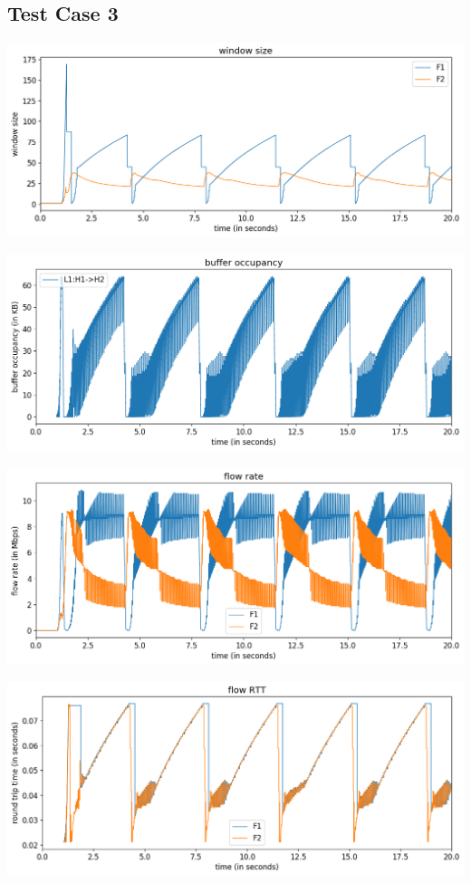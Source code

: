 \documentclass{article}
\begin{document}
\subsection{Test Case 3} 


\includegraphics[width = \textwidth]{"test_case3 window size"}

\includegraphics[width = \textwidth]{"test_case3 buffer occupancy"}

\includegraphics[width = \textwidth]{"test_case3 flow rate"}

\includegraphics[width = \textwidth]{"test_case3 flow RTT"}
\end{document}
